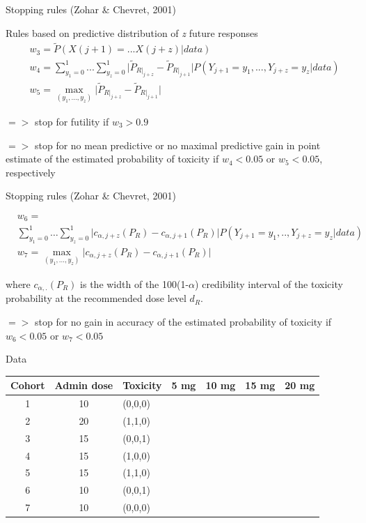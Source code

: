\documentclass{beamer}
\begin{document}
\begin{frame}{Stopping rules (Zohar \& Chevret, 2001)}

Rules based on predictive distribution of \emph{z} future responses 
\begin{align}
          & w_{3} = \tilde{P}( X\left(j+1\right)=...X\left(j+z\right)\vert data ) \\
          & w_{4} = \sum_{y_{1}=0}^{1}...\sum_{y_{z}=0}^{1}\vert \tilde{P}_{R\vert _{j+z}}-\tilde{P}_{R\vert _{j+1}}\vert P\left(Y_{j+1}=y_{1},...,Y_{j+z}=y_{z} \vert data \right) \\
          & w_{5} = \max_{(y_{1},...,y_{z})}\vert\tilde{P}_{R\vert_{j+z}}-\tilde{P}_{R\vert _{j+1}}\vert 
\end{align}


\(=>\) stop for futility if \(w_{3}>0.9\)

\(=>\) stop for no mean predictive or no maximal predictive gain in
point estimate of the estimated probability of toxicity if
\(w_{4}<0.05\) or \(w_{5}<0.05\), respectively

\end{frame}


\begin{frame}{Stopping rules (Zohar \& Chevret, 2001)}


\begin{align*}
          & w_{6} = \\
          &\sum_{y_1=0}^1\ldots\sum_{y_z=0}^1\vert c_{\alpha,j+z}(P_R)-c_{\alpha,j+1}(P_R)\vert P(Y_{j+1}=y_1,..,Y_{j+z}=y_z \vert data ) \\
          & w_{7} = \max_{(y_{1},...,y_{z})}\vert c_{\alpha,j+z}(P_{R})-c_{\alpha,j+1}(P_{R})\vert
\end{align*}



where \(c_{\alpha,.}\left(P_{R}\right)\) is the width of the
100(1-\(\alpha\)) credibility interval of the toxicity probability at
the recommended dose level \(d_{R}\).

\(=>\) stop for no gain in accuracy of the estimated probability of
toxicity if \(w_{6}<0.05\) or \(w_{7}<0.05\)

\end{frame}


\begin{frame}{Data}

\begin{longtable}{cclllll}
\toprule
Cohort & Admin dose & Toxicity & 5 mg & 10 mg &
15 mg & 20 mg\tabularnewline
\midrule
\endhead
1 & 10 & (0,0,0) & & & &\tabularnewline
2 & 20 & (1,1,0) & & & &\tabularnewline
3 & 15 & (0,0,1) & & & &\tabularnewline
4 & 15 & (1,0,0) & & & &\tabularnewline
5 & 15 & (1,1,0) & & & &\tabularnewline
6 & 10 & (0,0,1) & & & &\tabularnewline
7 & 10 & (0,0,0) & & & &\tabularnewline
\bottomrule
\end{longtable}

\end{frame}
\end{document}
